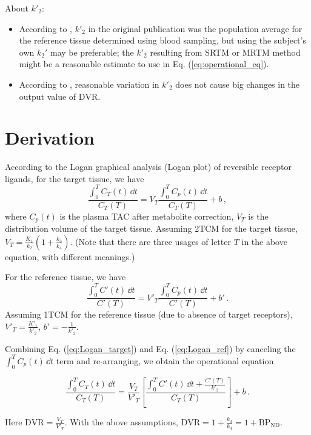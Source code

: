 \documentclass[11pt]{article}
\begin{document}
About $k'_2$:
\begin{itemize}
	\item According to \cite{PMODLoganRTM}, $k'_2$ in the original publication \cite{logan1996distribution} was the population average for the reference tissue determined using blood sampling, but using the subject's own $k_2'$ may be preferable; the $k'_2$ resulting from SRTM or MRTM method might be a reasonable estimate to use in Eq. (\ref{eq:operational_eq}).
	\item According to \cite{logan1996distribution}, reasonable variation in $k'_2$ does not cause big changes in the output value of $\text{DVR}$.
\end{itemize}





\section{Derivation}

According to the Logan graphical analysis (Logan plot) of reversible receptor ligands, for the target tissue, we have 
\begin{equation}
	\label{eq:Logan_target}
	\frac{\int_0^T \! C_T(t) \, \dd t }{C_T(T) } = V_T \frac{\int_0^T \! C_p(t) \, \dd t }{C_T(T)}  + b \, , 
\end{equation}
where $C_p(t)$ is the plasma TAC after metabolite correction, $V_T$ is the distribution volume of the target tissue. Assuming 2TCM for the target tissue, $V_T = \frac{K_1}{k_2} \left(1 + \frac{k_3}{k_4}\right)$. (Note that there are three usages of letter $T$ in the above equation, with different meanings.)

For the reference tissue, we have 
\begin{equation}
	\label{eq:Logan_ref}
	\frac{\int_0^T \! C'(t) \, \dd t }{C'(T) } = V'_T \frac{\int_0^T \! C_p(t) \, \dd t }{C'(T)}  + b' \, .
\end{equation}
Assuming 1TCM for the reference tissue (due to absence of target receptors), $V'_T = \frac{K'_1}{k'_2}$, $b' = -\frac{1}{k'_2}$.

Combining Eq. (\ref{eq:Logan_target}) and Eq. (\ref{eq:Logan_ref}) by canceling the $\int_0^T \! C_p(t) \, \dd t$ term and re-arranging, we obtain the operational equation

\begin{equation}
	\frac{\int_0^T \! C_T(t) \, \dd  t}{C_T(T)} = \frac{V_T}{V'_T} \left[\frac{\int_0^T \! C'(t) \, \dd t + \frac{C'(T)}{k'_2}}{C_T(T)}  \right] + b \, .
\end{equation}

Here $\text{DVR} = \frac{V_T}{V'_T}$. With the above assumptions, $\text{DVR} = 1  + \frac{k_3}{k_4} =  1 + \text{BP}_{\text{ND}}$.












\end{document}
